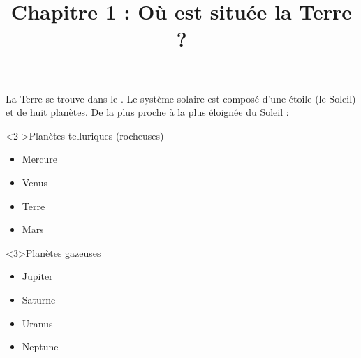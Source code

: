 \documentclass[xcolor={dvipsnames}]{beamer}
\title{Chapitre 1 : Où est située la Terre ?}
\begin{document}
\begin{frame}
  \titlepage 
\end{frame}



\begin{frame}

La Terre se trouve dans le .
Le système solaire est composé d'une étoile (le Soleil) et de huit planètes. \pause De la plus proche à la plus éloignée du Soleil :



\begin{block}<2->{Planètes telluriques (rocheuses)}
	\begin{center}
		\begin{itemize}
			\item Mercure
			\item Venus
			\item Terre
			\item Mars
		\end{itemize}
	\end{center}
\end{block}

\begin{block}<3>{Planètes gazeuses}
	\begin{center}
		\begin{itemize}
			\item Jupiter
			\item Saturne
			\item Uranus
			\item Neptune
		\end{itemize}
	\end{center}
\end{block}



\end{frame}
\end{document}
